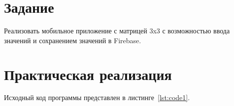 \documentclass[a4paper, 14pt]{extarticle}
\begin{document}
\renewcommand{\ttdefault}{pcr}

\setlength{\tabcolsep}{3pt}
\newpage
\setcounter{page}{2}

\section{Задание}\label{Sect::task}

Реализовать мобильное приложение с матрицей 3x3 с возможностью ввода значений и сохранением значений в Firebase.

\section{Практическая реализация}\label{Sect::code}

Исходный код программы представлен в листинге~\ref{lst:code1}.
\end{document}
